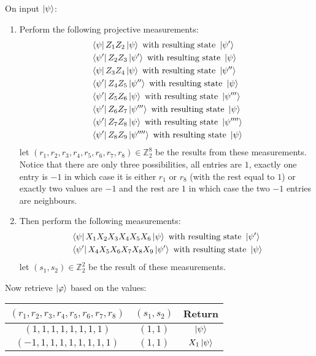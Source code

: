 \documentclass[12pt]{article}
\theoremstyle{plain}
\theoremstyle{definition}
\newcommand{\bb}[1]{\mathbb{#1}}
\begin{document}
\begin{algorithm}
	On input $\ket{\psi}$:
	\begin{enumerate}
		\item Perform the following projective measurements:
		\begin{align*}
			&\bra{\psi}Z_1Z_2\ket{\psi}\text{ with resulting state }\ket{\psi'}\\
			&\bra{\psi'}Z_2Z_3\ket{\psi'}\text{ with resulting state }\ket{\psi}\\
			&\bra{\psi}Z_3Z_4\ket{\psi}\text{ with resulting state }\ket{\psi''}\\
			&\bra{\psi'}Z_4Z_5\ket{\psi''}\text{ with resulting state }\ket{\psi}\\
			&\bra{\psi'}Z_5Z_6\ket{\psi}\text{ with resulting state }\ket{\psi'''}\\
			&\bra{\psi'}Z_6Z_7\ket{\psi'''}\text{ with resulting state }\ket{\psi}\\
			&\bra{\psi'}Z_7Z_8\ket{\psi}\text{ with resulting state }\ket{\psi''''}\\
			&\bra{\psi'}Z_8Z_9\ket{\psi''''}\text{ with resulting state }\ket{\psi}
		\end{align*}
		let $(r_1,r_2,r_3,r_4,r_5,r_6,r_7,r_8) \in \bb{Z}_2^8$ be the results from these measurements. Notice that there are only three possibilities, all entries are $1$, exactly one entry is $-1$ in which case it is either $r_1$ or $r_8$ (with the rest equal to $1$) or exactly two values are $-1$ and the rest are $1$ in which case the two $-1$ entries are neighbours.
		\item Then perform the following measurements:
		\begin{align*}
			&\bra{\psi}X_1X_2X_3X_4X_5X_6\ket{\psi}\text{ with resulting state }\ket{\psi'}\\
			&\bra{\psi'}X_4X_5X_6X_7X_8X_9\ket{\psi'}\text{ with resulting state }\ket{\psi}
		\end{align*}
		let $(s_1,s_2) \in \bb{Z}_2^2$ be the result of these measurements.
	\end{enumerate}
	\item Now retrieve $\ket{\varphi}$ based on the values:
	\begin{center}
		\begin{tabular}{|c|c|c|}
			\hline
			$(r_1,r_2,r_3,r_4,r_5,r_6,r_7,r_8)$ & $(s_1,s_2)$ & Return\\
			\hline
			$(1,1,1,1,1,1,1,1)$ & $(1,1)$ & $\ket{\psi}$\\
			\hline
			$(-1,1,1,1,1,1,1,1,1)$ & $(1,1)$ & $X_1\ket{\psi}$\\

\end{tabular}
\end{center}
\end{algorithm}
\end{document}

